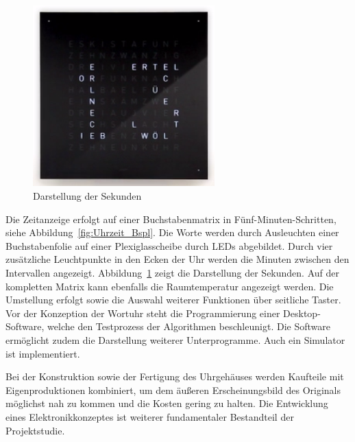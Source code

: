  \begin{figure}[t]
    \centering
    \includegraphics[width=7cm]{Abbildungen/Sekunden}
    \caption[Sekunden]{Darstellung der Sekunden}
    \label{fig:Sekunden}
\end{figure}
%
  \begin{multicols}{2}
Die Zeitanzeige erfolgt auf einer Buchstabenmatrix in Fünf-Minuten-Schritten, siehe Abbildung~\ref{fig:Uhrzeit_Bspl}. Die Worte werden durch Ausleuchten einer Buchstabenfolie auf einer Plexiglasscheibe durch LEDs abgebildet. Durch vier zusätzliche Leuchtpunkte in den Ecken der Uhr werden die Minuten zwischen den Intervallen angezeigt. Abbildung~\ref{fig:Sekunden} zeigt die Darstellung der Sekunden. Auf der kompletten Matrix kann ebenfalls die Raumtemperatur angezeigt werden. Die Umstellung erfolgt sowie die Auswahl weiterer Funktionen über seitliche Taster. Vor der Konzeption der Wortuhr steht die Programmierung einer Desktop-Software, welche den Testprozess der Algorithmen beschleunigt. Die Software ermöglicht zudem die Darstellung weiterer Unterprogramme. Auch ein Simulator ist implementiert.

Bei der Konstruktion sowie der Fertigung des Uhrgehäuses werden Kaufteile mit Eigenproduktionen kombiniert, um dem äußeren Erscheinungsbild des Originals möglichst nah zu kommen und die Kosten gering zu halten. Die Entwicklung eines Elektronikkonzeptes ist  weiterer fundamentaler Bestandteil der Projektstudie.
\end{multicols}



